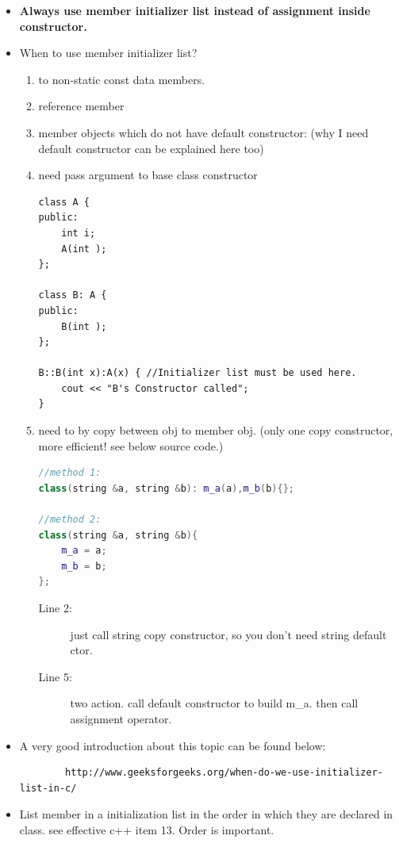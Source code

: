 \documentclass[a4paper,11pt,twoside]{book}
\begin{document}
\begin{itemize}
	\item \textbf{Always use member initializer list instead of assignment inside constructor.}
	
	\item When to use member initializer list?
	\begin{enumerate}
		\item to non-static const data members.
		\item reference member
		\item  member objects which do not have default constructor: (why I need default constructor can be explained here too)
		\item need pass argument to base class constructor
\begin{lstlisting}[numbers=none]
class A {
public:
	int i;
	A(int );
};
	
class B: A {
public:
	B(int );
};
	
B::B(int x):A(x) { //Initializer list must be used here.
    cout << "B's Constructor called";
}
\end{lstlisting}		
		
		\item need to by copy between obj to member obj. (only one copy constructor, more efficient! see below source code.)

\begin{lstlisting}[frame=single, language=c++]
//method 1:
class(string &a, string &b): m_a(a),m_b(b){};
		
//method 2:
class(string &a, string &b){   
	m_a = a;  
	m_b = b; 
};
\end{lstlisting}
	\begin{description}
		\item[Line 2:] just call string copy constructor, so you don't need string default ctor.
		\item[Line 5:] two action. call default constructor to build m\_a. then call assignment operator.
	\end{description}

	\end{enumerate}

    \item A very good introduction about this topic can be found below:	
	\begin{verbatim}
		http://www.geeksforgeeks.org/when-do-we-use-initializer-list-in-c/
	\end{verbatim}
	
	
	\item List member in a initialization list in the order in which they are declared in class. see effective c++ item 13. Order is important.
	

\end{itemize}
\end{document}
